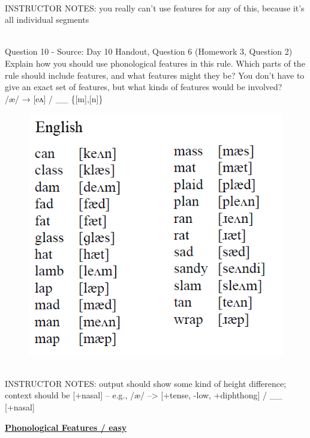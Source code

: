\documentclass[12pt]{article}
\begin{document}
~\\
INSTRUCTOR NOTES: you really can't use features for any of this, because it's all individual segments


~\\

{\large Question 10} - Source: Day 10 Handout, Question 6 (Homework 3, Question 2)\\

Explain how you should use phonological features in this rule. Which parts of the rule should include features, and what features might they be? You don't have to give an exact set of features, but what kinds of features would be involved?\\

/æ/ → {[eʌ]} / \_\_ \{{[m]},{[n]}\}

\begin{figure}[H]
\includegraphics{../images/english_aeraising.png}
\end{figure}

~\\
INSTRUCTOR NOTES: output should show some kind of height difference; context should be [+nasal] -- e.g., /æ/ --> [+tense, -low, +diphthong] / \_\_ [+nasal]


\newpage\textbf{\underline{\huge Phonological Features / easy\\}}

~\\
\end{document}
